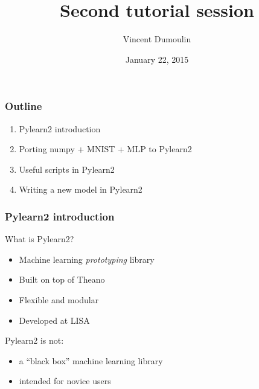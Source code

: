 \documentclass[mathserif, xcolor=dvipsnames]{beamer}
\title{Second tutorial session}
\author{Vincent Dumoulin}
\date{January 22, 2015}
\begin{document}
\begin{frame}[plain]
    \titlepage
\end{frame}

\begin{frame}
    \frametitle{Outline}
    \begin{enumerate}\addtolength{\itemsep}{1.5\baselineskip}
        \item{Pylearn2 introduction}
        \item{Porting numpy + MNIST + MLP to Pylearn2}
        \item{Useful scripts in Pylearn2}
        \item{Writing a new model in Pylearn2}
    \end{enumerate}
\end{frame}

\begin{frame}
    \frametitle{Pylearn2 introduction}

    \begin{block}{What is Pylearn2?}
    \begin{itemize}
        \item{Machine learning \emph{prototyping} library}
        \item{Built on top of Theano}
        \item{Flexible and modular}
        \item{Developed at LISA}
    \end{itemize}
    \end{block}

    \begin{alertblock}{Pylearn2 is not:}
    \begin{itemize}
        \item{a ``black box'' machine learning library}
        \item{intended for novice users}
    \end{itemize}
    \end{alertblock}
\end{frame}
\end{document}
